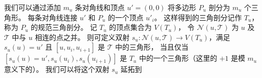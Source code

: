 \documentclass{ctexart}
\begin{document}
		我们可以通过添加 $m_u$ 条对角线和顶点 $u'=(0,0)$ 将多边形 $P_u$ 剖分为 $m_u$ 个三角形。
		每条对角线连接 $u'$ 和 $P_u$ 的一个顶点 $u'_i$。
		这样得到的三角剖分记作 $T_u$，称为 $P_u$ 的规范三角剖分。
		记 $T_u$ 的顶点集合为 $V(T_u)$，
		令 $\mathcal{N}(u,\mathcal{T})$ 为 $u$ 及 $\mathcal{T}$ 中与 $u$ 相连的点之并。
		则可定义双射 $s_u:\mathcal{N}(u,\mathcal{T})\rightarrow V(T_u)$，满足 $s_u(u)=u'$
		且 $[u,u_i,u_{i+1}]$ 是 $\mathcal{T}$ 中的三角形，
		当且仅当 $[s_u(u)=u',s_u(u_i),s_u(u_{i+1})]$ 是 $T_u$ 中的一个三角形（这里的 $+1$ 是模 $m_u$ 意义下的）。
		我们可以将这个双射 $s_u$ 延拓到
\end{document}
